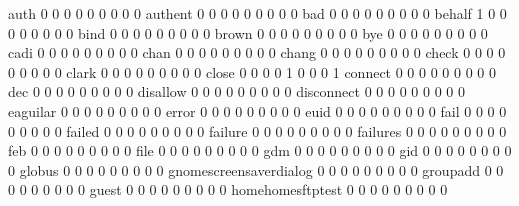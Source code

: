 \documentclass[compress,8pt]{beamer}
\begin{document}
\begin{frame}
\begin{Schunk}
  auth                                       0   0   0   0   0   0   0   0   0
  authent                                    0   0   0   0   0   0   0   0   0
  bad                                        0   0   0   0   0   0   0   0   0
  behalf                                     1   0   0   0   0   0   0   0   0
  bind                                       0   0   0   0   0   0   0   0   0
  brown                                      0   0   0   0   0   0   0   0   0
  bye                                        0   0   0   0   0   0   0   0   0
  cadi                                       0   0   0   0   0   0   0   0   0
  chan                                       0   0   0   0   0   0   0   0   0
  chang                                      0   0   0   0   0   0   0   0   0
  check                                      0   0   0   0   0   0   0   0   0
  clark                                      0   0   0   0   0   0   0   0   0
  close                                      0   0   0   0   1   0   0   0   1
  connect                                    0   0   0   0   0   0   0   0   0
  dec                                        0   0   0   0   0   0   0   0   0
  disallow                                   0   0   0   0   0   0   0   0   0
  disconnect                                 0   0   0   0   0   0   0   0   0
  eaguilar                                   0   0   0   0   0   0   0   0   0
  error                                      0   0   0   0   0   0   0   0   0
  euid                                       0   0   0   0   0   0   0   0   0
  fail                                       0   0   0   0   0   0   0   0   0
  failed                                     0   0   0   0   0   0   0   0   0
  failure                                    0   0   0   0   0   0   0   0   0
  failures                                   0   0   0   0   0   0   0   0   0
  feb                                        0   0   0   0   0   0   0   0   0
  file                                       0   0   0   0   0   0   0   0   0
  gdm                                        0   0   0   0   0   0   0   0   0
  gid                                        0   0   0   0   0   0   0   0   0
  globus                                     0   0   0   0   0   0   0   0   0
  gnomescreensaverdialog                     0   0   0   0   0   0   0   0   0
  groupadd                                   0   0   0   0   0   0   0   0   0
  guest                                      0   0   0   0   0   0   0   0   0
  homehomesftptest                           0   0   0   0   0   0   0   0   0

\end{Schunk}
\end{frame}
\end{document}
